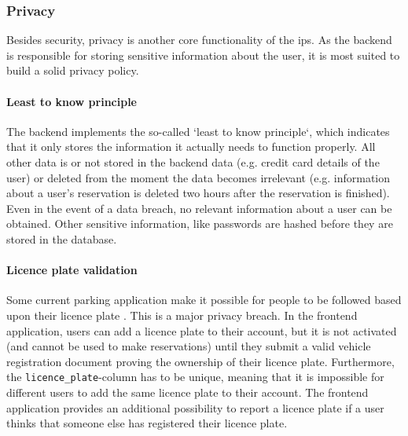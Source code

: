 \subsubsection{Privacy}
Besides security, privacy is another core functionality of the \ac{ips}. As the backend is responsible for storing sensitive information about the user, it is most suited to build a solid privacy policy.

\paragraph{Least to know principle}
The backend implements the so-called `least to know principle`, which indicates that it only stores the information it actually needs to function properly. All other data is or not stored in the backend data (e.g. credit card details of the user) or deleted from the moment the data becomes irrelevant (e.g. information about a user's reservation is deleted two hours after the reservation is finished). Even in the event of a data breach, no relevant information about a user can be obtained. Other sensitive information, like passwords are hashed before they are stored in the database.

\paragraph{Licence plate validation}\label{sec:licence-plate-validation}
Some current parking application make it possible for people to be followed based upon their licence plate \cite{privacy_breach}. This is a major privacy breach. In the frontend application, users can add a licence plate to their account, but it is not activated (and cannot be used to make reservations) until they submit a valid vehicle registration document proving the ownership of their licence plate. Furthermore, the \verb|licence_plate|-column has to be unique, meaning that it is impossible for different users to add the same licence plate to their account. The frontend application provides an additional possibility to report a licence plate if a user thinks that someone else has registered their licence plate.

